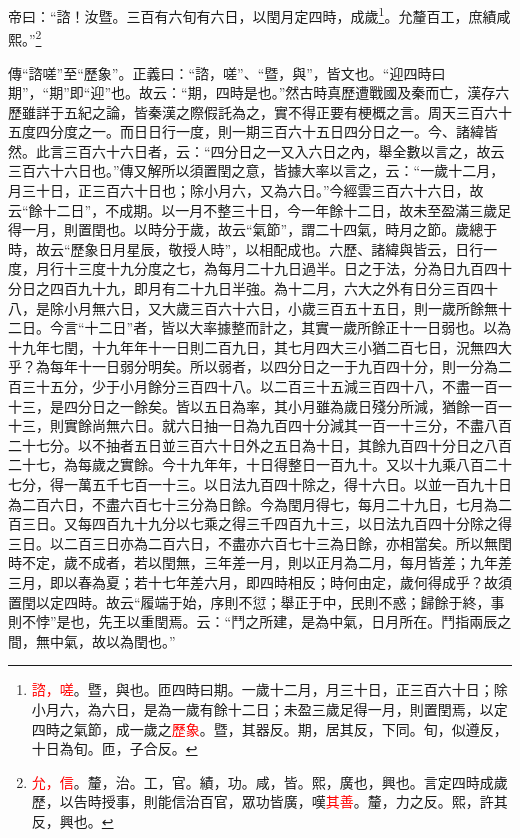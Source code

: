 帝曰：“諮！汝暨。三百有六旬有六日，以閏月定四時，成歲\footnote{\textcolor{red}{諮，嗟}。暨，與也。匝四時曰期。一歲十二月，月三十日，正三百六十日；除小月六，為六日，是為一歲有餘十二日；未盈三歲足得一月，則置閏焉，以定四時之氣節，成一歲之\textcolor{red}{歷象}。暨，其器反。期，居其反，下同。旬，似遵反，十日為旬。匝，子合反。}。允釐百工，庶績咸熙。”\footnote{\textcolor{red}{允，信}。釐，治。工，官。績，功。咸，皆。熙，廣也，興也。言定四時成歲歷，以告時授事，則能信治百官，眾功皆廣，嘆\textcolor{red}{其善}。釐，力之反。熙，許其反，興也。}

{\noindent\zhuan{}\fzbyks 傳“諮嗟”至“歷象”。正義曰：“諮，嗟”、“暨，與”，皆文也。“迎四時曰期”，“期”即“迎”也。故云：“期，四時是也。”然古時真歷遭戰國及秦而亡，漢存六歷雖詳于五紀之論，皆秦漢之際假託為之，實不得正要有梗概之言。周天三百六十五度四分度之一。而日日行一度，則一期三百六十五日四分日之一。今、諸緯皆然。此言三百六十六日者，云：“四分日之一又入六日之內，舉全數以言之，故云三百六十六日也。”傳又解所以須置閏之意，皆據大率以言之，云：“一歲十二月，月三十日，正三百六十日也；除小月六，又為六日。”今經雲三百六十六日，故云“餘十二日”，不成期。以一月不整三十日，今一年餘十二日，故未至盈滿三歲足得一月，則置閏也。以時分于歲，故云“氣節”，謂二十四氣，時月之節。歲總于時，故云“歷象日月星辰，敬授人時”，以相配成也。六歷、諸緯與皆云，日行一度，月行十三度十九分度之七，為每月二十九日過半。日之于法，分為日九百四十分日之四百九十九，即月有二十九日半強。為十二月，六大之外有日分三百四十八，是除小月無六日，又大歲三百六十六日，小歲三百五十五日，則一歲所餘無十二日。今言“十二日”者，皆以大率據整而計之，其實一歲所餘正十一日弱也。以為十九年七閏，十九年年十一日則二百九日，其七月四大三小猶二百七日，況無四大乎？為每年十一日弱分明矣。所以弱者，以四分日之一于九百四十分，則一分為二百三十五分，少于小月餘分三百四十八。以二百三十五減三百四十八，不盡一百一十三，是四分日之一餘矣。皆以五日為率，其小月雖為歲日殘分所減，猶餘一百一十三，則實餘尚無六日。就六日抽一日為九百四十分減其一百一十三分，不盡八百二十七分。以不抽者五日並三百六十日外之五日為十日，其餘九百四十分日之八百二十七，為每歲之實餘。今十九年年，十日得整日一百九十。又以十九乘八百二十七分，得一萬五千七百一十三。以日法九百四十除之，得十六日。以並一百九十日為二百六日，不盡六百七十三分為日餘。今為閏月得七，每月二十九日，七月為二百三日。又每四百九十九分以七乘之得三千四百九十三，以日法九百四十分除之得三日。以二百三日亦為二百六日，不盡亦六百七十三為日餘，亦相當矣。所以無閏時不定，歲不成者，若以閏無，三年差一月，則以正月為二月，每月皆差；九年差三月，即以春為夏；若十七年差六月，即四時相反；時何由定，歲何得成乎？故須置閏以定四時。故云“履端于始，序則不愆；舉正于中，民則不惑；歸餘于終，事則不悖”是也，先王以重閏焉。云：“鬥之所建，是為中氣，日月所在。鬥指兩辰之間，無中氣，故以為閏也。” \par}


